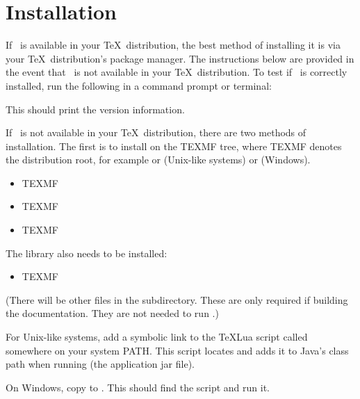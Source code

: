 \chapter{Installation}
\label{sec:install}

If \Jmakepdfx\ is available in your \TeX\ distribution, the best
method of installing it is via your \TeX\ distribution's package
manager. The instructions below are provided in the event that 
\Jmakepdfx\ is not available in your \TeX\ distribution.
To test if \Jmakepdfx\ is correctly installed, run the following in
a command prompt or terminal:
\begin{terminal}
 
\end{terminal}
This should print the version information.

If \Jmakepdfx\ is not available in your \TeX\ distribution, 
there are two methods of installation. The first is to install on
the TEXMF tree, where TEXMF denotes the distribution root, for
example 
or  (Unix-like systems) 
or  (Windows).

\begin{itemize}
\item TEXMF
\item TEXMF
\item TEXMF
\end{itemize}

The  library also needs to be installed:
\begin{itemize}
\item TEXMF
\end{itemize}
(There will be other files in the 
subdirectory. These are only required if building the
documentation. They are not needed to run .)

For Unix-like systems, add a symbolic link to the
\TeX Lua script  called
 somewhere on your system PATH.
This script locates  and adds it to Java's
class path when running  (the application jar
file).

On Windows, copy  to .
This should find the  script and run it.

